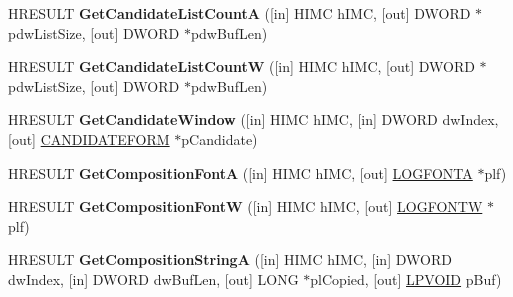 \begin{DoxyCompactItemize}
\item 
\mbox{\label{interface_i_active_i_m_m_app_afaedddf9f8afe26a2c6ffffacbce36a3}} 
H\+R\+E\+S\+U\+LT {\bfseries Get\+Candidate\+List\+CountA} (\mbox{[}in\mbox{]} H\+I\+MC h\+I\+MC, \mbox{[}out\mbox{]} D\+W\+O\+RD $\ast$pdw\+List\+Size, \mbox{[}out\mbox{]} D\+W\+O\+RD $\ast$pdw\+Buf\+Len)
\item 
\mbox{\label{interface_i_active_i_m_m_app_a523cdc7cdc60df401bba0cfaff174f7d}} 
H\+R\+E\+S\+U\+LT {\bfseries Get\+Candidate\+List\+CountW} (\mbox{[}in\mbox{]} H\+I\+MC h\+I\+MC, \mbox{[}out\mbox{]} D\+W\+O\+RD $\ast$pdw\+List\+Size, \mbox{[}out\mbox{]} D\+W\+O\+RD $\ast$pdw\+Buf\+Len)
\item 
\mbox{\label{interface_i_active_i_m_m_app_ae1d5f541d6756ea5d06288c8b85bce25}} 
H\+R\+E\+S\+U\+LT {\bfseries Get\+Candidate\+Window} (\mbox{[}in\mbox{]} H\+I\+MC h\+I\+MC, \mbox{[}in\mbox{]} D\+W\+O\+RD dw\+Index, \mbox{[}out\mbox{]} \hyperlink{struct_c_a_n_d_i_d_a_t_e_f_o_r_m}{C\+A\+N\+D\+I\+D\+A\+T\+E\+F\+O\+RM} $\ast$p\+Candidate)
\item 
\mbox{\label{interface_i_active_i_m_m_app_ac755d0065c241afcb25242f92bebb1ce}} 
H\+R\+E\+S\+U\+LT {\bfseries Get\+Composition\+FontA} (\mbox{[}in\mbox{]} H\+I\+MC h\+I\+MC, \mbox{[}out\mbox{]} \hyperlink{struct_l_o_g_f_o_n_t_a}{L\+O\+G\+F\+O\+N\+TA} $\ast$plf)
\item 
\mbox{\label{interface_i_active_i_m_m_app_aa3e4c88b06478c743e58f9d9b06a0064}} 
H\+R\+E\+S\+U\+LT {\bfseries Get\+Composition\+FontW} (\mbox{[}in\mbox{]} H\+I\+MC h\+I\+MC, \mbox{[}out\mbox{]} \hyperlink{struct_l_o_g_f_o_n_t_w}{L\+O\+G\+F\+O\+N\+TW} $\ast$plf)
\item 
\mbox{\label{interface_i_active_i_m_m_app_aec5b5b74a90948979f1be8eb0bdbff63}} 
H\+R\+E\+S\+U\+LT {\bfseries Get\+Composition\+StringA} (\mbox{[}in\mbox{]} H\+I\+MC h\+I\+MC, \mbox{[}in\mbox{]} D\+W\+O\+RD dw\+Index, \mbox{[}in\mbox{]} D\+W\+O\+RD dw\+Buf\+Len, \mbox{[}out\mbox{]} L\+O\+NG $\ast$pl\+Copied, \mbox{[}out\mbox{]} \hyperlink{interfacevoid}{L\+P\+V\+O\+ID} p\+Buf)
\item 
\mbox{\label{interface_i_active_i_m_m_app_a2385ccbc80b4c2216a436b857164660e}} 

\end{DoxyCompactItemize}

